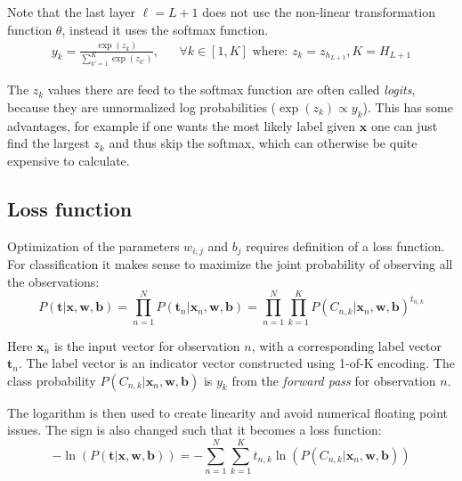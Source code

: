 Note that the last layer $\ell = L + 1$ does not use the non-linear transformation function $\theta$, instead it uses the softmax function.
\begin{equation}
\begin{aligned}
y_k = \frac{\exp(z_k)}{\sum_{k'=1}^K \exp(z_{k'})}, && \forall k \in [1, K] \text{ where: } z_k=z_{h_{L+1}}, K = H_{L + 1}
\end{aligned}
\label{eq:theory:ffnn:y}
\end{equation}

The $z_k$ values there are feed to the softmax function are often called \textit{logits}, because they are unnormalized log probabilities ($\exp(z_k) \propto y_k$). This has some advantages, for example if one wants the most likely label given $\mathbf{x}$ one can just find the largest $z_k$ and thus skip the softmax, which can otherwise be quite expensive to calculate.

\subsection{Loss function}

Optimization of the parameters $w_{i,j}$ and $b_{j}$ requires definition of a loss function. For classification it makes sense to maximize the joint probability of observing all the observations:
\begin{equation}
P(\mathbf{t} | \mathbf{x}, \mathbf{w}, \mathbf{b}) = \prod_{n=1}^N P(\mathbf{t}_n | \mathbf{x}_n, \mathbf{w}, \mathbf{b})  = \prod_{n=1}^N \prod_{k=1}^K P(C_{n, k} | \mathbf{x}_n, \mathbf{w}, \mathbf{b})^{t_{n, k}}
\end{equation}

Here $\mathbf{x}_{n}$ is the input vector for observation $n$, with a corresponding label vector $\mathbf{t}_n$. The label vector is an indicator vector constructed using 1-of-K encoding. The class probability $P(C_{n, k} | \mathbf{x}_n, \mathbf{w}, \mathbf{b})$ is $y_k$ from the \textit{forward pass} for observation $n$.

The logarithm is then used to create linearity and avoid numerical floating point issues. The sign is also changed such that it becomes a loss function:
\begin{equation}
- \ln\left(P(\mathbf{t} | \mathbf{x}, \mathbf{w}, \mathbf{b})\right) = - \sum_{n=1}^N \sum_{k=1}^K t_{n, k} \ln\left( P(C_{n, k} | \mathbf{x}_n, \mathbf{w}, \mathbf{b})\right)
\label{eq:theory:ffnn:long-loss}
\end{equation}

